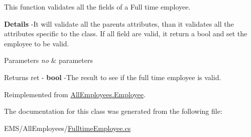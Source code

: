 This function validates all the fields of a Full time employee. 

{\bfseries Details} -\/\-It will validate all the parents attributes, than it validates all the attributes specific to the class. If all field are valid, it return a bool and set the employee to be valid.


\begin{DoxyParams}{Parameters}
{\em no} & parameters \\
\hline
\end{DoxyParams}
\begin{DoxyReturn}{Returns}
ret -\/ {\bfseries bool} -\/\-The result to see if the full time employee is valid. 
\end{DoxyReturn}


Reimplemented from \hyperlink{class_all_employees_1_1_employee_ad40f5a6a835b161d5d7474b89e353dea}{All\-Employees.\-Employee}.



The documentation for this class was generated from the following file\-:\begin{DoxyCompactItemize}
\item 
E\-M\-S/\-All\-Employees/\hyperlink{_fulltime_employee_8cs}{Fulltime\-Employee.\-cs}\end{DoxyCompactItemize}
